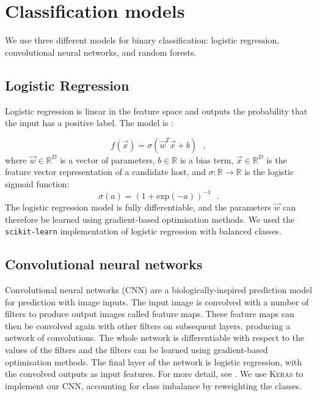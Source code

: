 \appendix

\section{Classification models}\label{sec:atlas-xid-models}

  We use three different models for binary classification: logistic
  regression, convolutional neural networks, and random forests.

  \subsection{Logistic Regression}
  \label{sec:atlas-logistic-regression}
    Logistic regression is linear in the feature space and outputs the
    probability that the input has a positive label. The model is
    \citep{bishop06ml}:

    \begin{equation}
        f(\vec x) = \sigma(\vec w^T \vec x + b) \,\,\,\,,
    \end{equation}
    where $\vec w \in \mathbb{R}^D$ is a vector of parameters, $b \in \mathbb{R}$ is a bias term, $\vec x \in \mathbb{R}^D$ is the feature vector representation of a candidate host, and $\sigma : \mathbb{R} \to \mathbb{R}$ is the logistic sigmoid function: \begin{equation}
        \sigma(a) = (1 + \mathrm{exp}(-a))^{-1}\,\,\,\,.
    \end{equation}%
    The logistic regression model is fully differentiable, and the parameters
    $\vec w$ can therefore be learned using gradient-based optimisation
    methods. {We used the \texttt{scikit-learn} \citep{pedregosa11sklearn}
    implementation of logistic regression with balanced classes}.

  \subsection{Convolutional neural networks}
  \label{sec:atlas-convolutional-neural-networks}

    Convolutional neural networks (CNN) are a biologically-inspired prediction
    model for prediction with image inputs. The input image is convolved with
    a number of filters to produce output images called feature maps. These
    feature maps can then be convolved again with other filters on subsequent
    layers, producing a network of convolutions. The whole network is
    differentiable with respect to the values of the filters and the filters
    can be learned using gradient-based optimisation methods. The final layer
    of the network is logistic regression, with the convolved outputs as input
    features. For more detail, see \citet[subsection II.A][]{lecun98}. We use
    \textsc{Keras} \citep{chollet15keras} to implement our CNN, accounting for
    class imbalance by reweighting the classes.

